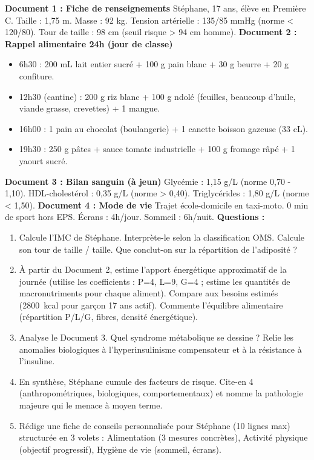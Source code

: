 \documentclass[11pt]{article}
\begin{document}
\begin{exercice}
\textbf{Document 1 : Fiche de renseignements}
Stéphane, 17 ans, élève en Première C. Taille : 1,75 m. Masse : 92 kg. Tension artérielle : 135/85 mmHg (norme < 120/80). Tour de taille : 98 cm (seuil risque > 94 cm homme).
\textbf{Document 2 : Rappel alimentaire 24h (jour de classe)}
\begin{itemize}
\item 6h30 : 200 mL lait entier sucré + 100 g pain blanc + 30 g beurre + 20 g confiture.
\item 12h30 (cantine) : 200 g riz blanc + 100 g ndolé (feuilles, beaucoup d'huile, viande grasse, crevettes) + 1 mangue.
\item 16h00 : 1 pain au chocolat (boulangerie) + 1 canette boisson gazeuse (33 cL).
\item 19h30 : 250 g pâtes + sauce tomate industrielle + 100 g fromage râpé + 1 yaourt sucré.
\end{itemize}
\textbf{Document 3 : Bilan sanguin (à jeun)}
Glycémie : 1,15 g/L (norme 0,70 - 1,10). HDL-cholestérol : 0,35 g/L (norme > 0,40). Triglycérides : 1,80 g/L (norme < 1,50).
\textbf{Document 4 : Mode de vie}
Trajet école-domicile en taxi-moto. 0 min de sport hors EPS. Écrans : 4h/jour. Sommeil : 6h/nuit.
\textbf{Questions :}
\begin{enumerate}
\item Calcule l'IMC de Stéphane. Interprète-le selon la classification OMS. Calcule son tour de taille / taille. Que conclut-on sur la répartition de l'adiposité ?
\item À partir du Document 2, estime l'apport énergétique approximatif de la journée (utilise les coefficients : P=4, L=9, G=4 ; estime les quantités de macronutriments pour chaque aliment). Compare aux besoins estimés (\SI{2800}{kcal} pour garçon 17 ans actif). Commente l'équilibre alimentaire (répartition P/L/G, fibres, densité énergétique).
\item Analyse le Document 3. Quel syndrome métabolique se dessine ? Relie les anomalies biologiques à l'hyperinsulinisme compensateur et à la résistance à l'insuline.
\item En synthèse, Stéphane cumule des facteurs de risque. Cite-en 4 (anthropométriques, biologiques, comportementaux) et nomme la pathologie majeure qui le menace à moyen terme.
\item Rédige une fiche de conseils personnalisée pour Stéphane (10 lignes max) structurée en 3 volets : Alimentation (3 mesures concrètes), Activité physique (objectif progressif), Hygiène de vie (sommeil, écrans).
\end{enumerate}
\end{exercice}
\end{document}
